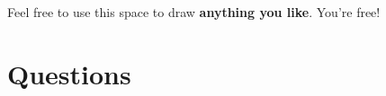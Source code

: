 \documentclass[addpoints,12pt]{exam}
\begin{document}
\vspace{\fill}

\begin{center}
  Feel free to use this space to draw \textbf{anything you like}. You're free! \\

  \vspace{10pt}

  \fbox{\rule{6in}{0pt}\rule[-0.5ex]{0pt}{2.5in}}
\end{center}


\newpage


\section*{Questions}
\end{document}
